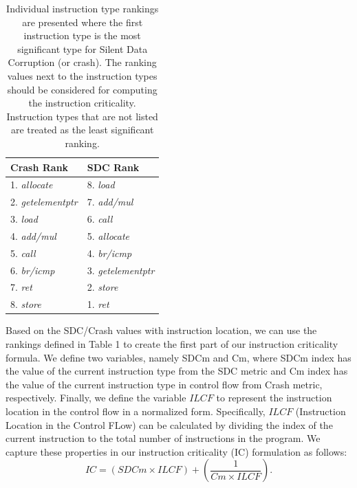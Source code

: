 \begin{table}
\begin{center}
\caption
{
Individual instruction type rankings are presented where the first instruction type is the most significant type for Silent Data Corruption (or crash). The ranking values next to the instruction types should be considered for computing the instruction criticality. Instruction types that are not listed are treated as the least significant ranking. 
} 
\begin{tabular}{ p{2.5cm} p{2.5cm}}
 \textbf{Crash Rank}& \textbf{SDC Rank} \\
 \hline
 1. \emph{allocate} & 8. \emph{load} \\
 2. \emph{getelementptr} & 7. \emph{add/mul}  \\
 3. \emph{load} & 6. \emph{call}  \\
 4. \emph{add/mul} & 5. \emph{allocate}  \\
 5. \emph{call} & 4. \emph{br/icmp}  \\
 6. \emph{br/icmp} & 3. \emph{getelementptr}  \\
 7. \emph{ret} & 2. \emph{store} \\
 8. \emph{store} & 1. \emph{ret}  \\
\end{tabular}
\end{center}
\end{table}

Based on the SDC/Crash values with instruction location, we can use the rankings defined in Table 1 to create the first part of our instruction criticality formula. We define two variables, namely SDCm and Cm, where SDCm index has the value of the current instruction type from the SDC metric and Cm index has the value of the current instruction type in control flow from Crash metric, respectively. Finally, we define the variable $ILCF$ to represent the instruction location in the control flow in a normalized form. Specifically, $ILCF$ (Instruction Location in the Control FLow) can be calculated by dividing the index of the current instruction to the total number of instructions in the program.  We capture these properties in our instruction criticality (IC) formulation as follows:  
\begin{equation}
IC = (SDCm \times ILCF) + (\frac{1}{Cm \times ILCF}).
\end{equation}

